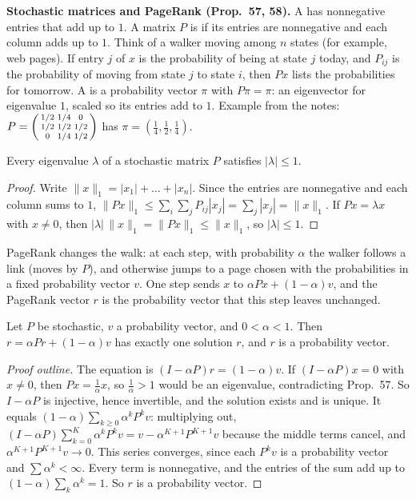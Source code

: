 \documentclass[10pt]{scrartcl}
\begin{document}
\textbf{Stochastic matrices and PageRank (Prop.~57, 58).} A  has nonnegative entries that add up to $1$. A matrix $P$ is  if its entries are nonnegative and each column adds up to $1$. Think of a walker moving among $n$ states (for example, web pages). If entry $j$ of $x$ is the probability of being at state $j$ today, and $P_{ij}$ is the probability of moving from state $j$ to state $i$, then $Px$ lists the probabilities for tomorrow. A  is a probability vector $\pi$ with $P\pi=\pi$: an eigenvector for eigenvalue $1$, scaled so its entries add to $1$. Example from the notes: $P=\begin{psmallmatrix}1/2&1/4&0\\1/2&1/2&1/2\\0&1/4&1/2\end{psmallmatrix}$ has $\pi=(\tfrac14,\tfrac12,\tfrac14)$.
\begin{proposition*}[Prop.~57]
  Every eigenvalue $\lambda$ of a stochastic matrix $P$ satisfies $|\lambda|\le1$.
\end{proposition*}
\begin{proof}
  Write $\|x\|_1=|x_1|+\dots+|x_n|$. Since the entries are nonnegative and each column sums to $1$, $\|Px\|_1\le\sum_i\sum_jP_{ij}|x_j|=\sum_j|x_j|=\|x\|_1$. If $Px=\lambda x$ with $x\ne0$, then $|\lambda|\,\|x\|_1=\|Px\|_1\le\|x\|_1$, so $|\lambda|\le1$.
\end{proof}
PageRank changes the walk: at each step, with probability $\alpha$ the walker follows a link (moves by $P$), and otherwise jumps to a page chosen with the probabilities in a fixed probability vector $v$. One step sends $x$ to $\alpha Px+(1-\alpha)v$, and the PageRank vector $r$ is the probability vector that this step leaves unchanged.
\begin{proposition*}
  Let $P$ be stochastic, $v$ a probability vector, and $0<\alpha<1$. Then $r=\alpha Pr+(1-\alpha)v$ has exactly one solution $r$, and $r$ is a probability vector.
\end{proposition*}
\begin{proof}[Proof outline]
  The equation is $(I-\alpha P)r=(1-\alpha)v$. If $(I-\alpha P)x=0$ with $x\ne0$, then $Px=\tfrac1\alpha x$, so $\tfrac1\alpha>1$ would be an eigenvalue, contradicting Prop.~57. So $I-\alpha P$ is injective, hence invertible, and the solution exists and is unique. It equals $(1-\alpha)\sum_{k\ge0}\alpha^kP^kv$: multiplying out, $(I-\alpha P)\sum_{k=0}^K\alpha^kP^kv=v-\alpha^{K+1}P^{K+1}v$ because the middle terms cancel, and $\alpha^{K+1}P^{K+1}v\to0$. This series converges, since each $P^kv$ is a probability vector and $\sum\alpha^k<\infty$. Every term is nonnegative, and the entries of the sum add up to $(1-\alpha)\sum_k\alpha^k=1$. So $r$ is a probability vector.
\end{proof}
\end{document}
